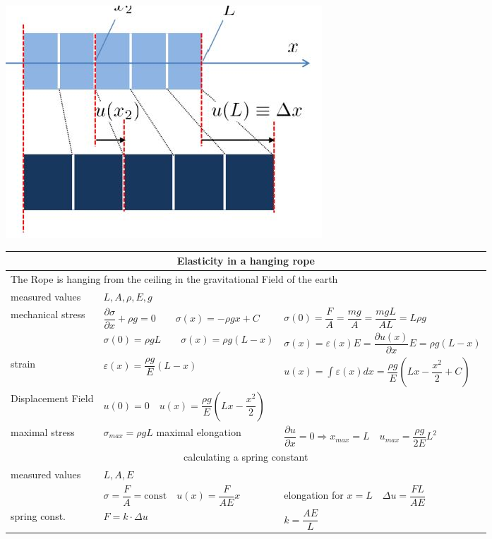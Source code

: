 		\includegraphics[scale=.3]{images/strain}


\begin{tabularx}{\columnwidth}{p{3cm}XX}
	\hline 
	\multicolumn{3}{c}{Elasticity in a hanging rope}\\
	\hline 
	\multicolumn{3}{l}{The Rope is hanging from the ceiling in the gravitational Field of the earth}\\
	
	measured values& $L, A,\rho, E, g$ & \\
	mechanical stress & $\dfrac{\partial \sigma}{\partial x}  + \rho g = 0 \qquad \sigma(x) = -\rho g x + C$ & $\sigma(0) = \dfrac{F}{A} = \dfrac{mg}{A} = \dfrac{mgL}{AL} = L\rho g$\\
	&$\sigma(0) =\rho g L \qquad \sigma(x)  = \rho g(L-x)$ &
	$\sigma(x) = \varepsilon(x) E = \dfrac{\partial u(x)}{\partial x}E = \rho g(L-x)$\\
	strain & $\varepsilon(x)= \dfrac{\rho g}{E}(L-x)$ & $u(x) = \int \varepsilon(x)dx = \dfrac{\rho g}{E}(Lx-\dfrac{x^2}{2}+C)$\\
	Displacement Field& $u(0) = 0 \quad u(x) =\dfrac{\rho g}{E}(Lx-\dfrac{x^2}{2})$ & \\
	maximal stress & $\sigma_{max} = \rho g L$ \hspace{1.3cm}maximal elongation&  $\dfrac{\partial u}{\partial x} = 0 \Rightarrow  x_{max} = L \quad u_{max} = \dfrac{\rho g}{2E}L^2$\\

	\hline 
	\multicolumn{3}{c}{calculating a spring constant}\\
	\hline 
	measured values & $L, A, E$&\\
	& $\sigma = \dfrac{F}{A} = \text{const} \quad u(x) = \dfrac{F}{AE}x$ & elongation for $x=L \quad \Delta u = \dfrac{FL}{AE}$\\
	spring const. & $F = k\cdot \Delta u$ & $k = \dfrac{AE}{L}$\\
	\hline 
	
\end{tabularx}
\newpage

